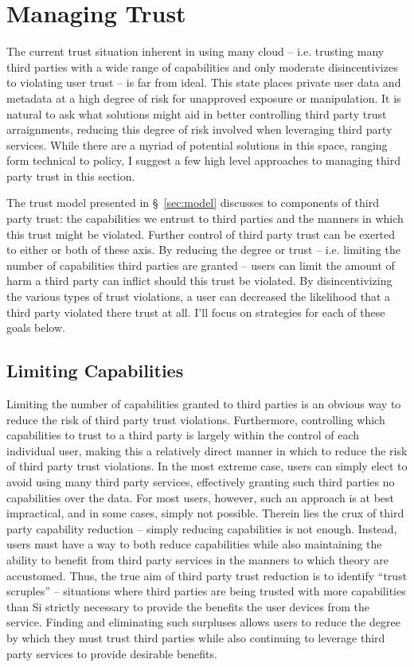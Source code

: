 \section{Managing Trust}
\label{sec:mitigation}

The current trust situation inherent in using many cloud --
i.e. trusting many third parties with a wide range of capabilities and
only moderate disincentivizes to violating user trust -- is far from
ideal. This state places private user data and metadata at a high
degree of risk for unapproved exposure or manipulation. It is natural
to ask what solutions might aid in better controlling third party
trust arraignments, reducing this degree of risk involved when
leveraging third party services. While there are a myriad of potential
solutions in this space, ranging form technical to policy, I suggest a
few high level approaches to managing third party trust in this
section.

The trust model presented in \S~\ref{sec:model} discusses to
components of third party trust: the capabilities we entrust to third
parties and the manners in which this trust might be violated. Further
control of third party trust can be exerted to either or both of these
axis. By reducing the degree or trust -- i.e. limiting the number of
capabilities third parties are granted -- users can limit the amount
of harm a third party can inflict should this trust be violated. By
disincentivizing the various types of trust violations, a user can
decreased the likelihood that a third party violated there trust at
all. I'll focus on strategies for each of these goals below.

\subsection{Limiting Capabilities}

Limiting the number of capabilities granted to third parties is an
obvious way to reduce the risk of third party trust
violations. Furthermore, controlling which capabilities to trust to a
third party is largely within the control of each individual user,
making this a relatively direct manner in which to reduce the risk of
third party trust violations. In the most extreme case, users can
simply elect to avoid using many third party services, effectively
granting such third parties no capabilities over the data. For most
users, however, such an approach is at best impractical, and in some
cases, simply not possible. Therein lies the crux of third party
capability reduction -- simply reducing capabilities is not
enough. Instead, users must have a way to both reduce capabilities
while also maintaining the ability to benefit from third party
services in the manners to which theory are accustomed. Thus, the true
aim of third party trust reduction is to identify ``trust scruples''
-- situations where third parties are being trusted with more
capabilities than Si strictly necessary to provide the benefits the
user devices from the service. Finding and eliminating such surpluses
allows users to reduce the degree by which they must trust third
parties while also continuing to leverage third party services to
provide desirable benefits.


